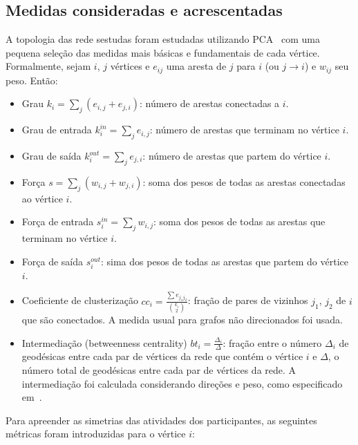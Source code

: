 \documentclass[a4paper,openright,12pt]{report} %
\begin{document}
\subsection{Medidas consideradas e acrescentadas}\label{sec:med}
A topologia das rede sestudas foram estudadas utilizando PCA~\cite{pca}
com uma pequena seleção das medidas mais básicas e fundamentais de cada vértice. Formalmente, sejam $i$, $j$ vértices e $e_{ij}$ uma aresta de $j$ para $i$ (ou $j\rightarrow i$) e $w_{ij}$ seu peso. Então:

\begin{itemize}
	\item Grau $k_i=\sum_j (e_{i,j}+e_{j,i})$: número de arestas conectadas a $i$.
	\item Grau de entrada $k_i^{in}=\sum_j e_{i,j}$: número de arestas que terminam no vértice $i$.
	\item Grau de saída $k_i^{out}=\sum_j e_{j,i}$: número de arestas que partem do vértice $i$.
	\item Força $s=\sum_j (w_{i,j}+w_{j,i})$: soma dos pesos de todas as arestas conectadas ao vértice $i$.
	\item Força de entrada $s_i^{in}=\sum_j w_{i,j}$: soma dos pesos de todas as arestas que terminam no vértice $i$.
	\item Força de saída $s_i^{out}$: sima dos pesos de todas as arestas que partem do vértice $i$.
	\item Coeficiente de clusterização $cc_i=\frac{\sum e_{j_1 j_2}}{\binom{k_i}{2}}$: fração de pares de vizinhos $j_1$, $j_2$ de $i$ que são conectados. A medida usual para grafos não direcionados foi usada.
\item Intermediação (betweenness centrality) $bt_i=\frac{\Delta_i}{\Delta}$: fração entre o número $\Delta_i$ de geodésicas entre cada par de vértices da rede que contém o vértice $i$ e $\Delta$, o número total de geodésicas entre cada par de vértices da rede.
	A intermediação foi calculada considerando direções e peso, como especificado em~\cite{faster}.
\end{itemize}

Para apreender as simetrias das atividades dos participantes, as
seguintes métricas foram introduzidas para o vértice $i$:
\end{document}
